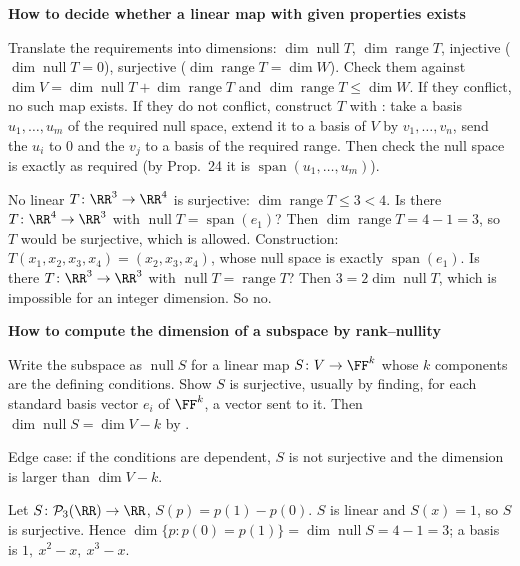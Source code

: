 \documentclass[10pt]{scrartcl}
\DeclareMathOperator{\spn}{span}\DeclareMathOperator{\nul}{null}\DeclareMathOperator{\range}{range}
\newcommand{\PP}{\mathcal P}\newcommand{\LL}{\mathcal L}\newcommand{\MM}{\mathcal M}
\newenvironment{methodbox}[1]{\begin{mdframed}[style=methodstyle]\textbf{\color{NavyBlue}#1}\par\vspace{2pt}}{\end{mdframed}}
\begin{document}
\begin{methodbox}{How to decide whether a linear map with given properties exists}
  \begin{steps}
    \ii Translate the requirements into dimensions: $\dim\nul T$, $\dim\range T$, injective ($\dim\nul T=0$), surjective ($\dim\range T=\dim W$).
    \ii Check them against $\dim V=\dim\nul T+\dim\range T$ and $\dim\range T\le\dim W$. If they conflict, no such map exists.
    \ii If they do not conflict, construct $T$ with : take a basis $u_1,\dots,u_m$ of the required null space, extend it to a basis of $V$ by $v_1,\dots,v_n$, send the $u_i$ to $0$ and the $v_j$ to a basis of the required range. Then check the null space is exactly as required (by Prop.~24 it is $\spn(u_1,\dots,u_m)$).
  \end{steps}
\end{methodbox}

\begin{example*}
  \begin{itemize}
    \ii No linear $T\colon\RR^3\to\RR^4$ is surjective: $\dim\range T\le3<4$.
    \ii Is there $T\colon\RR^4\to\RR^3$ with $\nul T=\spn(e_1)$? Then $\dim\range T=4-1=3$, so $T$ would be surjective, which is allowed. Construction: $T(x_1,x_2,x_3,x_4)=(x_2,x_3,x_4)$, whose null space is exactly $\spn(e_1)$.
    \ii Is there $T\colon\RR^3\to\RR^3$ with $\nul T=\range T$? Then $3=2\dim\nul T$, which is impossible for an integer dimension. So no.
  \end{itemize}
\end{example*}

\begin{methodbox}{How to compute the dimension of a subspace by rank--nullity}
  \begin{steps}
    \ii Write the subspace as $\nul S$ for a linear map $S\colon V\to\FF^k$ whose $k$ components are the defining conditions.
    \ii Show $S$ is surjective, usually by finding, for each standard basis vector $e_i$ of $\FF^k$, a vector sent to it.
    \ii Then $\dim\nul S=\dim V-k$ by .
  \end{steps}
  Edge case: if the conditions are dependent, $S$ is not surjective and the dimension is larger than $\dim V-k$.
\end{methodbox}

\begin{example*}[Polynomials in $\PP_3(\RR)$ with $p(0)=p(1)$]
  Let $S\colon\PP_3(\RR)\to\RR$, $S(p)=p(1)-p(0)$. $S$ is linear and $S(x)=1$, so $S$ is surjective. Hence $\dim\{p:p(0)=p(1)\}=\dim\nul S=4-1=3$; a basis is $1,\ x^2-x,\ x^3-x$.
\end{example*}
\end{document}
